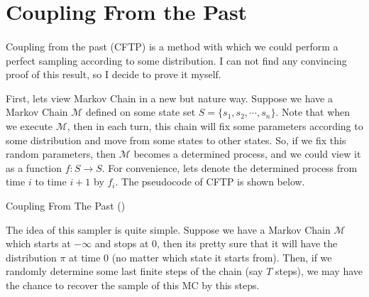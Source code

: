 \section{Coupling From the Past}
\paragraph{}
Coupling from the past (CFTP) is a method with which we could perform a perfect sampling according to some distribution.
I can not find any convincing proof of this result, so I decide to prove it myself.

First, lets view Markov Chain in a new but nature way.
Suppose we have a Markov Chain $\mathcal{M}$ defined on some state set $S = \{s_1, s_2, \cdots, s_n\}$.
Note that when we execute $\mathcal{M}$, then in each turn, this chain will fix some parameters according to some distribution and move from some states to other states.
So, if we fix this random parameters, then $\mathcal{M}$ becomes a determined process, and we could view it as a function $f: S\to S$. For convenience, lets denote the determined process from time $i$ to time $i+1$ by $f_i$.
The pseudocode of CFTP is shown below.
\begin{algorithm}
  Coupling From The Past () 
\end{algorithm}

The idea of this sampler is quite simple.
Suppose we have a Markov Chain $\mathcal{M}$ which starts at $-\infty$ and stops at $0$, then its pretty sure that it will have the distribution $\pi$ at time $0$ (no matter which state it starts from).
Then, if we randomly determine some last finite steps of the chain (say $T$ steps), we may have the chance to recover the sample of this MC by this steps.

